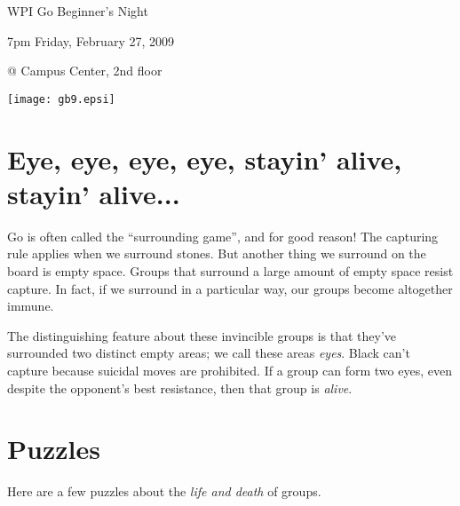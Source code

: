 \documentclass{article}
\begin{document}
\centerline{\Huge WPI Go Beginner's Night}
\centerline{\Huge 7pm Friday, February 27, 2009}
\centerline{\Huge @ Campus Center, 2nd floor}
\vfill

\begin{center}
\texttt{[image: gb9.epsi]}
\end{center}

\vfill

\newpage

\section*{Eye, eye, eye, eye, stayin' alive, stayin' alive...}

Go is often called the ``surrounding game'', and for good reason!  The
capturing rule applies when we surround stones.  But another thing we
surround on the board is empty space.  Groups that surround a large
amount of empty space resist capture.  In fact, if we surround in a
particular way, our groups become altogether immune.
\begin{center}
\hspace{.2in}
\hspace{.2in}
%
%
\hspace{.2in}
\end{center}
The distinguishing feature about these invincible groups is that
they've surrounded two distinct empty areas; we call these areas
\emph{eyes}.  Black can't capture because suicidal moves are
prohibited.  If a group can form two eyes, even despite the opponent's
best resistance, then that group is \emph{alive}.


\section*{Puzzles}
Here are a few puzzles about the \emph{life and death} of groups.
\begin{center}
\hspace{.3in}
\hspace{.3in}
\end{center}
\end{document}
